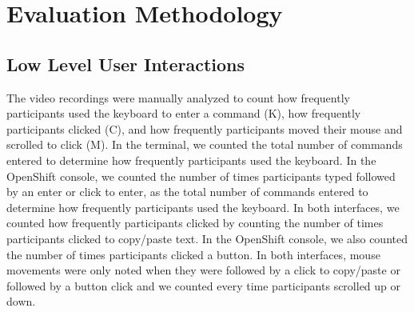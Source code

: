 \documentclass[11pt, oneside]{article}   	%
\begin{document}

\section{Evaluation Methodology}
\subsection{Low Level User Interactions}
The video recordings were manually analyzed to count how frequently participants used the keyboard to enter a command (K), how frequently participants clicked (C), and how frequently participants moved their mouse and scrolled to click (M). In the terminal, we counted the total number of commands entered to determine how frequently participants used the keyboard. In the OpenShift console, we counted the number of times participants typed followed by an enter or click to enter, as the total number of commands entered to determine how frequently participants used the keyboard. In both interfaces, we counted how frequently participants clicked by counting the number of times participants clicked to copy/paste text. In the OpenShift console, we also counted the number of times participants clicked a button. In both interfaces, mouse movements were only noted when they were followed by a click to copy/paste or followed by a button click and we counted every time participants scrolled up or down. 

\begin{comment}
\begin{table}
 \centering
  \begin{tabular}{ | c | c | c | }
  \hline
  Computer Input Measures & kubectl CLI & OpenShift Console \\ 
  \hline
  Commands Entered & & \\ 
  \hline
  Clicks & & \\ 
  \hline
  Mouse Movements & & \\ 
  \hline
  \end{tabular}
 \caption{.}
 \label{table:t}
\end{table}
\end{comment}
\end{document}
